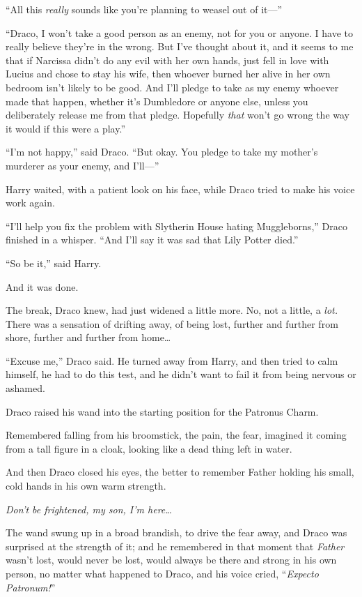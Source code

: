 “All this \emph{really} sounds like you’re planning to weasel out of it—”

“Draco, I won’t take a good person as an enemy, not for you or anyone. I have to really believe they’re in the wrong. But I’ve thought about it, and it seems to me that if Narcissa didn’t do any evil with her own hands, just fell in love with Lucius and chose to stay his wife, then whoever burned her alive in her own bedroom isn’t likely to be good. And I’ll pledge to take as my enemy whoever made that happen, whether it’s Dumbledore or anyone else, unless you deliberately release me from that pledge. Hopefully \emph{that} won’t go wrong the way it would if this were a play.”

“I’m not happy,” said Draco. “But okay. You pledge to take my mother’s murderer as your enemy, and I’ll—”

Harry waited, with a patient look on his face, while Draco tried to make his voice work again.

“I’ll help you fix the problem with Slytherin House hating Muggleborns,” Draco finished in a whisper. “And I’ll say it was sad that Lily Potter died.”

“So be it,” said Harry.

And it was done.

The break, Draco knew, had just widened a little more. No, not a little, a \emph{lot.} There was a sensation of drifting away, of being lost, further and further from shore, further and further from home…

“Excuse me,” Draco said. He turned away from Harry, and then tried to calm himself, he had to do this test, and he didn’t want to fail it from being nervous or ashamed.

Draco raised his wand into the starting position for the Patronus Charm.

Remembered falling from his broomstick, the pain, the fear, imagined it coming from a tall figure in a cloak, looking like a dead thing left in water.

And then Draco closed his eyes, the better to remember Father holding his small, cold hands in his own warm strength.

\emph{Don’t be frightened, my son, I’m here…}

The wand swung up in a broad brandish, to drive the fear away, and Draco was surprised at the strength of it; and he remembered in that moment that \emph{Father} wasn’t lost, would never be lost, would always be there and strong in his own person, no matter what happened to Draco, and his voice cried, “\emph{Expecto Patronum!}”

